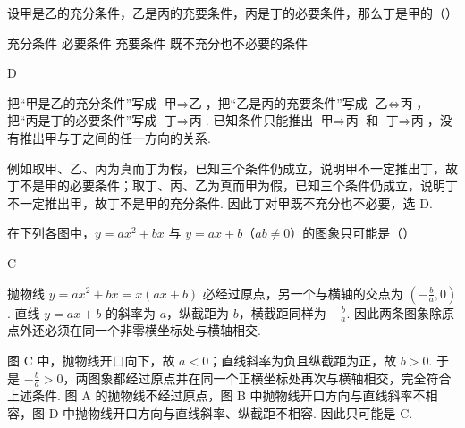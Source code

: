 \documentclass[UTF8,a4paper,oneside,11pt]{ctexbook}
\begin{document}
\begin{problem}
设甲是乙的充分条件，乙是丙的充要条件，丙是丁的必要条件，那么丁是甲的（\quad）

\choices
    {充分条件}
    {必要条件}
    {充要条件}
    {既不充分也不必要的条件}
\end{problem}

\begin{answer}
D
\end{answer}

\begin{solution}
把“甲是乙的充分条件”写成 \(\text{甲}\Rightarrow\text{乙}\)，把“乙是丙的充要条件”写成 \(\text{乙}\Leftrightarrow\text{丙}\)，把“丙是丁的必要条件”写成 \(\text{丁}\Rightarrow\text{丙}\). 已知条件只能推出 \(\text{甲}\Rightarrow\text{丙}\) 和 \(\text{丁}\Rightarrow\text{丙}\)，没有推出甲与丁之间的任一方向的关系.

例如取甲、乙、丙为真而丁为假，已知三个条件仍成立，说明甲不一定推出丁，故丁不是甲的必要条件；取丁、丙、乙为真而甲为假，已知三个条件仍成立，说明丁不一定推出甲，故丁不是甲的充分条件. 因此丁对甲既不充分也不必要，选 D.
\end{solution}

\begin{problem}
在下列各图中，\(y = ax^2 + bx\) 与 \(y = ax + b\)（\(ab \neq 0\)）的图象只可能是（\quad）

\choices
    {}
    {}
    {}
    {}
\end{problem}

\begin{answer}
C
\end{answer}

\begin{solution}
抛物线 \(y=ax^2+bx=x(ax+b)\) 必经过原点，另一个与横轴的交点为 \(\left(-\frac{b}{a},0\right)\). 直线 \(y=ax+b\) 的斜率为 \(a\)，纵截距为 \(b\)，横截距同样为 \(-\frac{b}{a}\). 因此两条图象除原点外还必须在同一个非零横坐标处与横轴相交.

图 C 中，抛物线开口向下，故 \(a<0\)；直线斜率为负且纵截距为正，故 \(b>0\). 于是 \(-\frac{b}{a}>0\)，两图象都经过原点并在同一个正横坐标处再次与横轴相交，完全符合上述条件. 图 A 的抛物线不经过原点，图 B 中抛物线开口方向与直线斜率不相容，图 D 中抛物线开口方向与直线斜率、纵截距不相容. 因此只可能是 C.
\end{solution}
\end{document}
